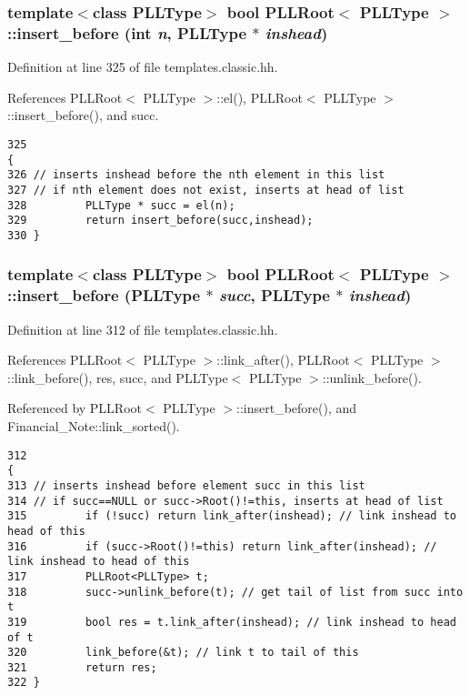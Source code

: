 \subsubsection{\setlength{\rightskip}{0pt plus 5cm}template$<$class PLLType$>$ bool PLLRoot$<$ {\bf PLLType} $>$::insert\_\-before (int {\em n}, {\bf PLLType} $\ast$ {\em inshead})\hspace{0.3cm}{\tt  [inline]}}\label{classPLLRoot_a15}




Definition at line 325 of file templates.classic.hh.

References PLLRoot$<$ PLLType $>$::el(), PLLRoot$<$ PLLType $>$::insert\_\-before(), and succ.



\footnotesize\begin{verbatim}325                                                                     {
326 // inserts inshead before the nth element in this list
327 // if nth element does not exist, inserts at head of list
328         PLLType * succ = el(n);
329         return insert_before(succ,inshead);
330 } 
\end{verbatim}\normalsize 
{}
\subsubsection{\setlength{\rightskip}{0pt plus 5cm}template$<$class PLLType$>$ bool PLLRoot$<$ {\bf PLLType} $>$::insert\_\-before ({\bf PLLType} $\ast$ {\em succ}, {\bf PLLType} $\ast$ {\em inshead})\hspace{0.3cm}{\tt  [inline]}}\label{classPLLRoot_a14}




Definition at line 312 of file templates.classic.hh.

References PLLRoot$<$ PLLType $>$::link\_\-after(), PLLRoot$<$ PLLType $>$::link\_\-before(), res, succ, and PLLType$<$ PLLType $>$::unlink\_\-before().

Referenced by PLLRoot$<$ PLLType $>$::insert\_\-before(), and Financial\_\-Note::link\_\-sorted().



\footnotesize\begin{verbatim}312                                                                              {
313 // inserts inshead before element succ in this list
314 // if succ==NULL or succ->Root()!=this, inserts at head of list
315         if (!succ) return link_after(inshead); // link inshead to head of this
316         if (succ->Root()!=this) return link_after(inshead); // link inshead to head of this
317         PLLRoot<PLLType> t;
318         succ->unlink_before(t); // get tail of list from succ into t
319         bool res = t.link_after(inshead); // link inshead to head of t
320         link_before(&t); // link t to tail of this
321         return res;
322 } 
\end{verbatim}\normalsize 
{}
